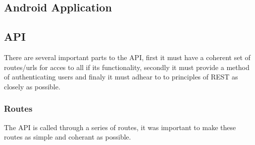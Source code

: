 \documentclass[11pt,a4paper]{article}
\begin{document}
\subsection{Android Application}


\subsection{API}

There are several important parts to the API, first it must have a coherent set of routes/urls for acces to all if its functionality, secondly it must provide a method of authenticating users and finaly it must adhear to to principles of REST as closely as possible. 

\subsubsection{Routes}

The API is called through a series of routes, it was important to make these routes as simple and coherant as possible.
\end{document}
